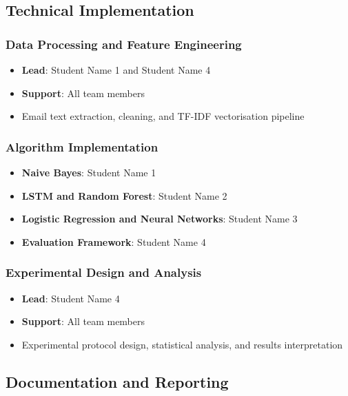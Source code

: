 \documentclass[11pt,a4paper]{article}
\begin{document}
\subsection{Technical Implementation}

\subsubsection{Data Processing and Feature Engineering}
\begin{itemize}
    \item \textbf{Lead}: Student Name 1 and Student Name 4
    \item \textbf{Support}: All team members
    \item Email text extraction, cleaning, and TF-IDF vectorisation pipeline
\end{itemize}

\subsubsection{Algorithm Implementation}
\begin{itemize}
    \item \textbf{Naive Bayes}: Student Name 1
    \item \textbf{LSTM and Random Forest}: Student Name 2
    \item \textbf{Logistic Regression and Neural Networks}: Student Name 3
    \item \textbf{Evaluation Framework}: Student Name 4
\end{itemize}

\subsubsection{Experimental Design and Analysis}
\begin{itemize}
    \item \textbf{Lead}: Student Name 4
    \item \textbf{Support}: All team members
    \item Experimental protocol design, statistical analysis, and results interpretation
\end{itemize}

\subsection{Documentation and Reporting}
\end{document}

